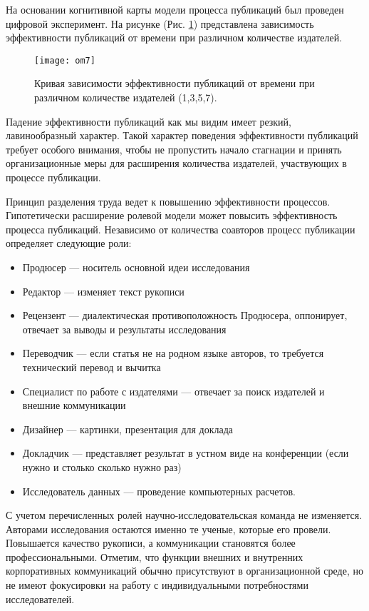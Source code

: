 На основании когнитивной карты модели процесса публикаций был проведен цифровой эксперимент.
На рисунке (Рис. \ref{fig:om7}) представлена зависимость эффективности публикаций от времени при различном количестве издателей.

\begin{figure}[H]
  \caption{Кривая зависимости эффективности публикаций от времени при различном количестве издателей (1,3,5,7).}
  \centering
    \texttt{[image: om7]}
  \label{fig:om7}
\end{figure} 

Падение эффективности публикаций как мы видим имеет резкий, лавинообразный характер. 
Такой характер поведения эффективности публикаций требует особого внимания, чтобы не пропустить начало стагнации и принять организационные меры для расширения количества издателей, участвующих в процессе публикации.  

Принцип разделения труда ведет к повышению эффективности процессов. 
Гипотетически расширение ролевой модели может повысить эффективность процесса публикаций. 
Независимо от количества соавторов процесс публикации определяет следующие роли: 

\begin{itemize}
\tightlist
\item Продюсер — носитель основной идеи исследования
\item Редактор — изменяет текст рукописи
\item Рецензент — диалектическая противоположность Продюсера, оппонирует, отвечает за выводы и результаты исследования
\item Переводчик — если статья не на родном языке авторов, то требуется технический перевод и вычитка
\item Специалист по работе с издателями — отвечает за поиск издателей и внешние коммуникации
\item Дизайнер — картинки, презентация для доклада
\item Докладчик — представляет результат в устном виде на конференции (если нужно и столько сколько нужно раз)
\item Исследователь данных — проведение компьютерных расчетов.
\end{itemize}

С учетом перечисленных ролей научно-исследовательская команда не изменяется.
Авторами исследования остаются именно те ученые, которые его провели. 
Повышается качество рукописи, а коммуникации становятся более профессиональными. 
Отметим, что функции внешних и внутренних корпоративных коммуникаций обычно присутствуют в организационной среде, но не имеют фокусировки на работу с индивидуальными потребностями исследователей.

